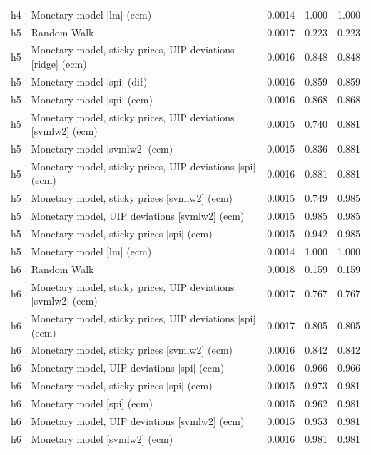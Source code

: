 \begin{ThreePartTable}
\begin{longtable}[t]{cp{5.5cm}ccc}
h4 & \raggedright Monetary model [lm] (ecm) & 0.0014 & 1.000 & 1.000\\
\addlinespace
h5 & \raggedright Random Walk & 0.0017 & 0.223 & 0.223\\
h5 & \raggedright Monetary model, sticky prices, UIP deviations [ridge] (ecm) & 0.0016 & 0.848 & 0.848\\
h5 & \raggedright Monetary model [spi] (dif) & 0.0016 & 0.859 & 0.859\\
h5 & \raggedright Monetary model [spi] (ecm) & 0.0016 & 0.868 & 0.868\\
h5 & \raggedright Monetary model, sticky prices, UIP deviations [svmlw2] (ecm) & 0.0015 & 0.740 & 0.881\\
h5 & \raggedright Monetary model [svmlw2] (ecm) & 0.0015 & 0.836 & 0.881\\
h5 & \raggedright Monetary model, sticky prices, UIP deviations [spi] (ecm) & 0.0016 & 0.881 & 0.881\\
h5 & \raggedright Monetary model, sticky prices [svmlw2] (ecm) & 0.0015 & 0.749 & 0.985\\
h5 & \raggedright Monetary model, UIP deviations [svmlw2] (ecm) & 0.0015 & 0.985 & 0.985\\
h5 & \raggedright Monetary model, sticky prices [spi] (ecm) & 0.0015 & 0.942 & 0.985\\
h5 & \raggedright Monetary model [lm] (ecm) & 0.0014 & 1.000 & 1.000\\
\addlinespace
h6 & \raggedright Random Walk & 0.0018 & 0.159 & 0.159\\
h6 & \raggedright Monetary model, sticky prices, UIP deviations [svmlw2] (ecm) & 0.0017 & 0.767 & 0.767\\
h6 & \raggedright Monetary model, sticky prices, UIP deviations [spi] (ecm) & 0.0017 & 0.805 & 0.805\\
h6 & \raggedright Monetary model, sticky prices [svmlw2] (ecm) & 0.0016 & 0.842 & 0.842\\
h6 & \raggedright Monetary model, UIP deviations [spi] (ecm) & 0.0016 & 0.966 & 0.966\\
h6 & \raggedright Monetary model, sticky prices [spi] (ecm) & 0.0015 & 0.973 & 0.981\\
h6 & \raggedright Monetary model [spi] (ecm) & 0.0015 & 0.962 & 0.981\\
h6 & \raggedright Monetary model, UIP deviations [svmlw2] (ecm) & 0.0015 & 0.953 & 0.981\\
h6 & \raggedright Monetary model [svmlw2] (ecm) & 0.0016 & 0.981 & 0.981\\

\end{longtable}
\end{ThreePartTable}
